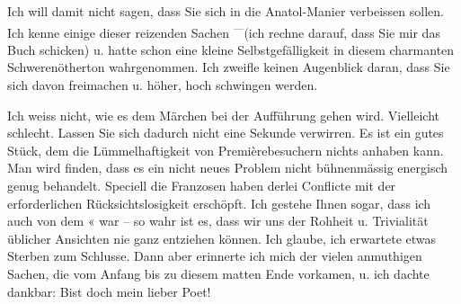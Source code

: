 \pstart
           Ich will damit nicht sagen, dass Sie sich in die Anatol-Manier verbeissen sollen. Ich kenne einige dieser reizenden Sachen
               \substVorne{}\textsuperscript{—}\substDazwischen{}(\substHinten{}ich rechne darauf, dass Sie mir das Buch schicken) u. hatte schon eine kleine Selbstgefälligkeit
               in diesem charmanten Schwerenötherton wahrgenommen. Ich zweifle keinen Augenblick
               daran, dass Sie sich davon freimachen u. höher, hoch schwingen werden.\pend
           
\pstart
           Ich weiss nicht, wie es dem Märchen bei der
               Aufführung gehen wird. Vielleicht schlecht. Lassen Sie sich dadurch nicht eine
               Sekunde verwirren. Es ist ein gutes Stück, dem die Lümmelhaftigkeit von
               Premièrebesuchern nichts anhaben kann. Man wird finden, dass es ein nicht neues
               Problem nicht {\pb}bühnenmässig energisch
               genug behandelt. Speciell die Franzosen haben
               derlei Conflicte mit der erforderlichen Rücksichtslosigkeit erschöpft. Ich gestehe
               Ihnen sogar, dass ich auch von dem \label{K_L03823-6v}\label{K_L03823-6}« war – so wahr ist
               es, dass wir uns der Rohheit u. Trivialität üblicher Ansichten nie ganz entziehen
               können. Ich glaube, ich erwartete etwas Sterben zum Schlusse. Dann aber erinnerte ich
               mich der vielen anmuthigen Sachen, die vom Anfang bis zu diesem matten Ende vorkamen,
               u. ich dachte  dankbar: Bist doch mein lieber
               Poet!\pend
           
